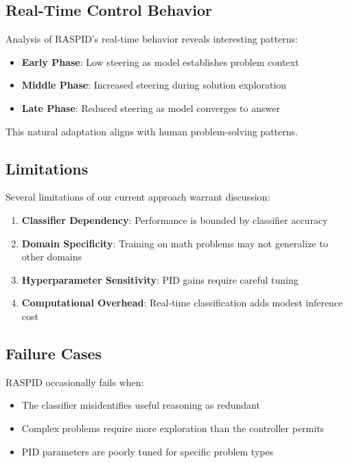 \documentclass{article}
\begin{document}
\subsection{Real-Time Control Behavior}

Analysis of RASPID's real-time behavior reveals interesting patterns:

\begin{itemize}
\item \textbf{Early Phase}: Low steering as model establishes problem context
\item \textbf{Middle Phase}: Increased steering during solution exploration
\item \textbf{Late Phase}: Reduced steering as model converges to answer
\end{itemize}

This natural adaptation aligns with human problem-solving patterns.

\subsection{Limitations}

Several limitations of our current approach warrant discussion:

\begin{enumerate}
\item \textbf{Classifier Dependency}: Performance is bounded by classifier accuracy
\item \textbf{Domain Specificity}: Training on math problems may not generalize to other domains
\item \textbf{Hyperparameter Sensitivity}: PID gains require careful tuning
\item \textbf{Computational Overhead}: Real-time classification adds modest inference cost
\end{enumerate}

\subsection{Failure Cases}

RASPID occasionally fails when:
\begin{itemize}
\item The classifier misidentifies useful reasoning as redundant
\item Complex problems require more exploration than the controller permits
\item PID parameters are poorly tuned for specific problem types
\end{itemize}
\end{document}
